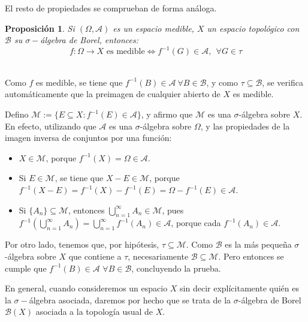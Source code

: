 \documentclass[11pt, a4paper]{article}
\makeatletter
\newif\IfInSansMode
\let\oldsf\sffamily
\renewcommand*{\sffamily}{\oldsf\mathversion{sans}\InSansModetrue}
\let\oldnorm\normalfont
\renewcommand*{\normalfont}{\oldnorm\InSansModefalse\mathversion{normal}}
\renewenvironment{proof}[1][\proofname] {\par\pushQED{\qed}\normalfont\topsep6\p@\@plus6\p@\relax\trivlist\item[\hskip\labelsep\itshape\sffamily#1\@addpunct{.}]\ignorespaces}{\popQED\endtrivlist\@endpefalse}
\theoremstyle{theorem-style}
\newtheorem{nprop}{Proposición}[section]
\theoremstyle{definition-style}
\theoremstyle{remark-style}
\theoremstyle{example-style}
\makeatother
\begin{document}
El resto de propiedades se comprueban de forma análoga.

\begin{nprop}Si $(\Omega,\mathscr A)$ es un espacio medible, $X$ un espacio topológico con $\mathcal B$ su $\sigma-$álgebra de Borel, entonces:
  \[
    f: \Omega \to X \text{ es medible} \iff f^{-1}(G) \in \mathscr A, \ \ \forall G \in \tau
  \]
\end{nprop}

  \begin{proof} \hfill \\
	\boxed{\Rightarrow} Como $f$ es medible, se tiene que $f^{-1}(B) \in \mathscr A \ \forall B \in \mathcal B$, y como $\tau \subseteq \mathcal B$, se verifica automáticamente que la preimagen de cualquier abierto de $X$ es medible.

\boxed{\Leftarrow} Defino $\mathcal M := \{ E \subseteq X: f^{-1}(E) \in \mathscr A\}$, y afirmo que $\mathcal M$ es una $\sigma$-álgebra sobre $X$. En efecto, utilizando que $\mathscr A$ es una $\sigma$-álgebra sobre $\Omega$, y las propiedades de la imagen inversa de conjuntos por una función:

\begin{itemize}
	\item $X \in \mathcal M$, porque $f^{-1}(X) = \Omega \in \mathscr A$.

    \item Si $E \in \mathcal M$, se tiene que $X - E \in \mathcal M$, porque $f^{-1}(X-E) = f^{-1}(X) - f^{-1}(E) = \Omega - f^{-1}(E) \in \mathscr A$.

    \item Si $\{A_n\} \subseteq \mathcal M$, entonces $\bigcup_{n=1}^\infty A_n \in \mathcal M$, pues $f^{-1}\left( \bigcup_{n=1}^\infty A_n \right) = \bigcup_{n=1}^\infty f^{-1}(A_n) \in \mathscr A$, porque cada $f^{-1}(A_n) \in \mathscr A$.
\end{itemize}

Por otro lado, tenemos que, por hipótesis, $\tau \subseteq \mathcal M$. Como $\mathcal B$ es la más pequeña $\sigma$-álgebra sobre $X$ que contiene a $\tau$, necesariamente $\mathcal B \subseteq \mathcal M$. Pero entonces se cumple que \mbox{$f^{-1}(B) \in \mathscr A$} $\forall B \in \mathcal B$, concluyendo la prueba.
\end{proof}

En general, cuando consideremos un espacio $X$ sin decir explícitamente quién es la $\sigma-$álgebra asociada, daremos por hecho que se trata de la $\sigma$-álgebra de Borel $\mathcal B(X)$ asociada a la topología usual de $X$.
\end{document}
